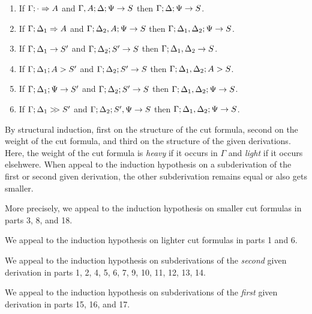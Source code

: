 \documentclass{sig-alt}
\begin{document}
\begin{Teorema}
\begin{enumerate}
\item If $\Gamma;\cdot\Rightarrow A$ and $\Gamma, A;\Delta;\Psi\rightarrow S$ then $\Gamma;\Delta;\Psi\rightarrow S$.
\item If $\Gamma;\Delta_1\Rightarrow A$ and $\Gamma;\Delta_2, A;\Psi\rightarrow S$ then $\Gamma;\Delta_1, \Delta_2;\Psi\rightarrow S$.
\\
\item If $\Gamma;\Delta_1\rightarrow S'$ and $\Gamma;\Delta_2;S'\rightarrow S$ then $\Gamma;\Delta_1,\Delta_2\rightarrow S$.
\item If $\Gamma;\Delta_1;A\mathrel>S'$ and $\Gamma;\Delta_2;S'\rightarrow S$ then $\Gamma;\Delta_1,\Delta_2;A\mathrel>S$.
\item If $\Gamma;\Delta_1;\Psi\rightarrow S'$ and $\Gamma;\Delta_2;S'\rightarrow S$ then $\Gamma;\Delta_1,\Delta_2;\Psi\rightarrow S$.
\item If $\Gamma;\Delta_1\mathrel{>\!\! >}S'$ and $\Gamma;\Delta_2;S',\Psi\rightarrow S$ then $\Gamma;\Delta_1,\Delta_2;\Psi\rightarrow S$.
\end{enumerate}
\end{Teorema}

\begin{Demo}
By structural induction, first on the structure of the cut formula,
second on the weight of the cut formula, and third on the structure of
the given derivations.  Here, the weight of the cut formula is
\emph{heavy} if it occurs in $\Gamma$ and \emph{light} if it occurs
elsehwere.  When appeal to the induction hypothesis on a subderivation
of the first or second given derivation, the other subderivation remains
equal or also gets smaller.

More precisely, we appeal to the induction hypothesis
on smaller cut formulas in parts 3, 8, and 18.

We appeal to the induction hypothesis on lighter cut formulas
in parts 1 and 6.

We appeal to the induction hypothesis
on subderivations of the \emph{second} given derivation
in parts 1, 2, 4, 5, 6, 7, 9, 10, 11, 12, 13, 14.

We appeal to the induction hypothesis
on subderivations of the \emph{first} given derivation
in parts 15, 16, and 17.


\end{Demo}
\end{document}

